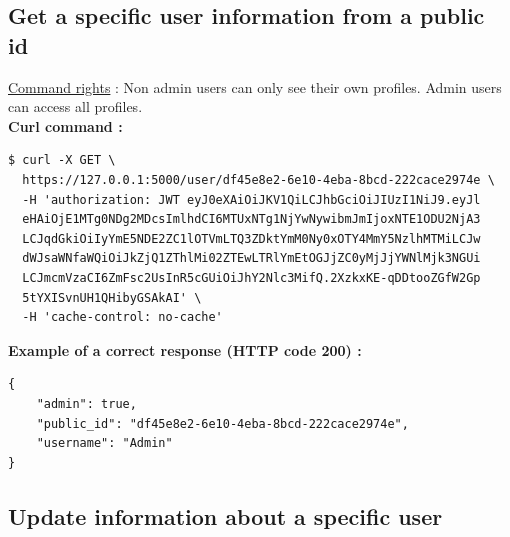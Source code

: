 \subsection{Get a specific user information from a public id}

\underline{Command rights} : Non admin users can only see their own profiles. Admin users can access all profiles.\\

\textbf{Curl command :}

\begin{tcolorbox}[top=-3mm, bottom=-3mm, left=0mm, right=0mm, enhanced, breakable, colback=LightGray, colframe=DarkGray, colbacktitle=DarkGray]
\begin{verbatim}
$ curl -X GET \
  https://127.0.0.1:5000/user/df45e8e2-6e10-4eba-8bcd-222cace2974e \
  -H 'authorization: JWT eyJ0eXAiOiJKV1QiLCJhbGciOiJIUzI1NiJ9.eyJl
  eHAiOjE1MTg0NDg2MDcsImlhdCI6MTUxNTg1NjYwNywibmJmIjoxNTE1ODU2NjA3
  LCJqdGkiOiIyYmE5NDE2ZC1lOTVmLTQ3ZDktYmM0Ny0xOTY4MmY5NzlhMTMiLCJw
  dWJsaWNfaWQiOiJkZjQ1ZThlMi02ZTEwLTRlYmEtOGJjZC0yMjJjYWNlMjk3NGUi
  LCJmcmVzaCI6ZmFsc2UsInR5cGUiOiJhY2Nlc3MifQ.2XzkxKE-qDDtooZGfW2Gp
  5tYXISvnUH1QHibyGSAkAI' \
  -H 'cache-control: no-cache' 
\end{verbatim}
\end{tcolorbox}

\textbf{Example of a correct response (HTTP code 200) : }

\begin{tcolorbox}[top=-3mm, bottom=-3mm, left=0mm, right=0mm, enhanced, breakable, colback=LightGray, colframe=DarkGray, colbacktitle=DarkGray]
\begin{verbatim}
{
    "admin": true,
    "public_id": "df45e8e2-6e10-4eba-8bcd-222cace2974e",
    "username": "Admin"
}
\end{verbatim}
\end{tcolorbox}

\subsection{Update information about a specific user}

